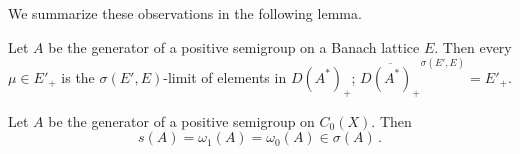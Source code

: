 We summarize these observations in the following lemma.

\begin{lemma}\label{lem:b4-1.3}
Let $A$ be the generator of a positive semigroup on a Banach lattice $E$. Then every $\mu \in E'_+$ is the $\sigma(E',E)$-limit of elements in $D(A^*)_{+}$; \ie $\overline{D(A^*)_+}^{\sigma(E',E)} = E'_+$.
\end{lemma}

\begin{theorem}\label{thm:b4-1.4}
Let $A$ be the generator of a positive semigroup on $C_{0}(X)$. 
Then
\[
   s(A) = \omega_1(A) = \omega_{0}(A) \in \sigma(A)\,.
\]
\end{theorem}
